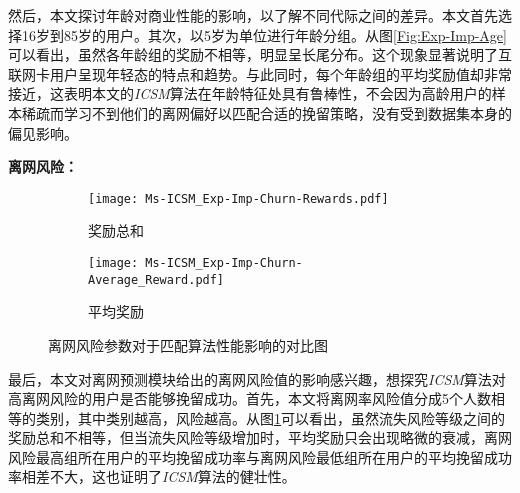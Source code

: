 然后，本文探讨年龄对商业性能的影响，以了解不同代际之间的差异。本文首先选择16岁到85岁的用户。其次，以5岁为单位进行年龄分组。从图\ref{Fig:Exp-Imp-Age}可以看出，虽然各年龄组的奖励不相等，明显呈长尾分布。这个现象显著说明了互联网卡用户呈现年轻态的特点和趋势。与此同时，每个年龄组的平均奖励值却非常接近，这表明本文的\emph{ICSM}算法在年龄特征处具有鲁棒性，不会因为高龄用户的样本稀疏而学习不到他们的离网偏好以匹配合适的挽留策略，没有受到数据集本身的偏见影响。

\textbf{离网风险：}
\begin{figure}[!htb]
	\centering
	\begin{subfigure}[t]{0.49\linewidth}
		\captionsetup{justification=centering} %
		\begin{minipage}[b]{1\linewidth}
			\texttt{[image: Ms-ICSM\_Exp-Imp-Churn-Rewards.pdf]}
			\caption{奖励总和}
		\end{minipage}
	\end{subfigure}
	\begin{subfigure}[t]{0.49\linewidth}
		\captionsetup{justification=centering} %
		\begin{minipage}[b]{1\linewidth}
			\texttt{[image: Ms-ICSM\_Exp-Imp-Churn-Average\_Reward.pdf]}
			\caption{平均奖励}
		\end{minipage}
	\end{subfigure}	
	\caption{离网风险参数对于匹配算法性能影响的对比图}
	\label{Fig:Exp-Imp-Churn}
\end{figure}
最后，本文对离网预测模块给出的离网风险值的影响感兴趣，想探究\emph{ICSM}算法对高离网风险的用户是否能够挽留成功。首先，本文将离网率风险值分成5个人数相等的类别，其中类别越高，风险越高。从图\ref{Fig:Exp-Imp-Churn}可以看出，虽然流失风险等级之间的奖励总和不相等，但当流失风险等级增加时，平均奖励只会出现略微的衰减，离网风险最高组所在用户的平均挽留成功率与离网风险最低组所在用户的平均挽留成功率相差不大，这也证明了\emph{ICSM}算法的健壮性。

